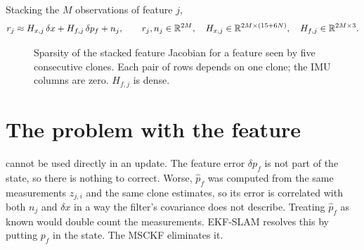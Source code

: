 Stacking the $M$ observations of feature $j$,
\begin{equation}
  r_j \approx H_{x,j}\,\delta x + H_{f,j}\,\delta p_f + n_j, \qquad
  r_j, n_j \in \mathbb{R}^{2M},\quad H_{x,j} \in \mathbb{R}^{2M\times(15+6N)},\quad H_{f,j} \in \mathbb{R}^{2M\times3}.
  \label{eq:stacked-feature}
\end{equation}

\begin{figure}[t]
\centering
{}
\caption{Sparsity of the stacked feature Jacobian for a feature seen by five consecutive clones. Each pair of rows depends
on one clone; the IMU columns are zero. $H_{f,j}$ is dense.}
\label{fig:hx-sparsity}
\end{figure}

\section{The problem with the feature}

 cannot be used directly in an update. The feature error $\delta p_f$ is not part of the state, so there is
nothing to correct. Worse, $\hat p_f$ was computed from the same measurements $z_{j,i}$ and the same clone estimates, so its error is
correlated with both $n_j$ and $\delta x$ in a way the filter's covariance does not describe. Treating $\hat p_f$ as known would
double count the measurements. EKF-SLAM resolves this by putting $p_f$ in the state. The MSCKF eliminates it.


